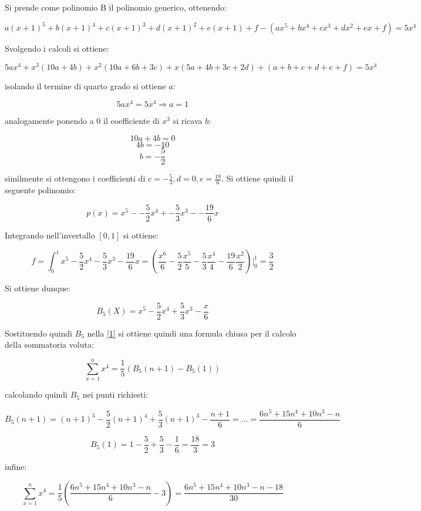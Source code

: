\documentclass{article}
\begin{document}
Si prende come polinomio B il polinomio generico, ottenendo:

$$a(x+1)^5+b(x+1)^4+c(x+1)^3+d(x+1)^2+e(x+1)+f - (ax^5+bx^4+cx^3+dx^2+ex+f) = 5x^4$$

Svolgendo i calcoli si ottiene:

$$5ax^4 + x^3(10a+4b) + x^2(10a+6b+3c)+x(5a+4b+3c+2d)+(a+b+c+d+e+f)=5x^4$$ 

isolando il termine di quarto grado si ottiene $a$:

$$5ax^4=5x^4 \Rightarrow a = 1$$

analogamente ponendo a 0 il coefficiente di $x^3$ si ricava $b$:

$$10a + 4b = 0$$ 
$$4b = -10$$ 
$$b = -\frac{5}{2}$$

similmente si ottengono i coefficienti di $c = -\frac{5}{3}, d = 0, e = \frac{19}{6}$. Si ottiene quindi il seguente polinomio:

$$p(x) = x^5 - -\frac{5}{2}x^4 + -\frac{5}{3}x^3 - -\frac{19}{6}x$$

Integrando nell'invertallo $[0, 1]$ si ottiene:

$$f = \int_0^1{x^5 -\frac{5}{2}x^4 -\frac{5}{3}x^3 -\frac{19}{6}x} = (\frac{x^6}{6} - \frac{5}{2}\frac{x^5}{5} -\frac{5}{3}\frac{x^4}{4} -  \frac{19}{6}\frac{x^2}{2})|_0^1 = \frac{3}{2}$$ 

Si ottiene dunque: 

$$B_5(X) = x^5 - \frac{5}{2}x^4 + \frac{5}{3}x^3 - \frac{x}{6}$$

Sostituendo quindi $B_5$ nella \ref{1} si ottiene quindi una formula chiusa per il calcolo della sommatoria voluta: 

$$\sum_{x=1}^{n}{x^4} = \frac{1}{5}(B_5(n+1) - B_5(1))$$

calcolando quindi $B_5$ nei punti richiesti: 

$$B_5(n+1) = (n+1)^5 - \frac{5}{2}(n+1)^4 + \frac{5}{3}(n+1)^3 - \frac{n+1}{6} =  ... = \frac{6n^5+15n^4+10n^3-n}{6}$$

$$B_5(1) = 1 - \frac{5}{2} + \frac{5}{3} - \frac{1}{6} = \frac{18}{3} = 3$$

infine:

$$\sum_{x=1}^{n}{x^4} = \frac{1}{5}(\frac{6n^5+15n^4+10n^3-n}{6}-3)=\frac{6n^5+15n^4+10n^3-n-18}{30}$$
\end{document}
